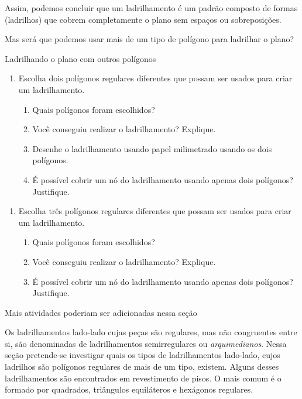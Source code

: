 Assim, podemos concluir que um ladrilhamento é um padrão composto de formas (ladrilhos) que cobrem completamente o plano sem espaços ou sobreposições.



Mas será que podemos usar mais de um tipo de polígono para ladrilhar o plano?





\begin{task}{Ladrilhando o plano com outros polígonos}
\begin{enumerate}
	\item Escolha dois polígonos regulares diferentes que possam ser usados para criar um ladrilhamento.
	\begin{enumerate}
		\item Quais polígonos foram escolhidos?
		\item Você conseguiu realizar o ladrilhamento? Explique.
		\item Desenhe o ladrilhamento usando papel milimetrado usando os dois polígonos.
		\item É possível cobrir um nó do ladrilhamento usando apenas dois polígonos? Justifique.
	\end{enumerate}
\end{enumerate}

\begin{enumerate}
	\item Escolha três polígonos regulares diferentes que possam ser usados para criar um ladrilhamento.
	\begin{enumerate}
		\item Quais polígonos foram escolhidos?
		\item Você conseguiu realizar o ladrilhamento? Explique.
		\item É possível cobrir um nó do ladrilhamento usando apenas dois polígonos? Justifique.
	\end{enumerate}
\end{enumerate}


\end{task}

Mais atividades poderiam ser adicionadas nessa seção


Os ladrilhamentos lado-lado cujas peças são regulares, mas não congruentes entre si, são denominadas de ladrilhamentos semirregulares ou \textit{arquimedianos}. Nessa seção pretende-se investigar quais os tipos de ladrilhamentos lado-lado, cujos ladrilhos são polígonos regulares de mais de um tipo, existem. Alguns desses ladrilhamentos são encontrados em revestimento de pisos. O mais comum é o formado por quadrados, triângulos equiláteros e hexágonos regulares.

